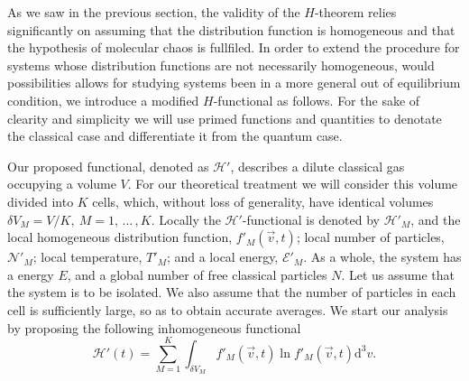 As we saw in the previous section,
the validity of the $H$-theorem relies significantly on assuming
that the distribution function is homogeneous and that the hypothesis of
molecular chaos is fullfiled. In order to extend the procedure for systems whose
distribution functions are not necessarily homogeneous, would possibilities allows 
for studying systems been in a more general out of equilibrium condition, we introduce a modified $H$-functional 
as follows. For the sake of clearity and simplicity we will use primed functions
and quantities to denotate the classical case and differentiate it from the quantum
case.

Our proposed functional, denoted as $\mathcal{H}'$, describes a dilute classical
gas occupying a volume $V$. For our theoretical treatment we will consider this volume
divided into $K$ cells, which, without loss of generality,
have identical volumes $\delta V_M = V/K,\ M=1,\,\dots\,,K$.
Locally the $\mathcal{H}'$-functional is denoted by $\mathcal{H}'_M$, and 
the local homogeneous distribution function, $f'_{M}(\vec{v},t)$; local 
number of particles, $\mathcal{N}'_M$; local temperature, $T'_M$; and a local 
energy, $\mathcal{E}'_M$. As a whole, the system has a
energy $E$, and a global number of free classical particles $N$. Let us assume that the system is 
to be isolated. We also assume that the number of particles
in each cell is sufficiently large, so as to obtain accurate averages.
We start our analysis by proposing the following inhomogeneous functional
%
\begin{equation}\label{eq:cHdef}
   \mathcal{H}'(t)=\sum_{M=1}^{K}\int_{\delta V_M} f'_M(\vec{v},t) \ln f'_M(\vec{v},t)\mathrm{d}^3v.
\end{equation}
%


